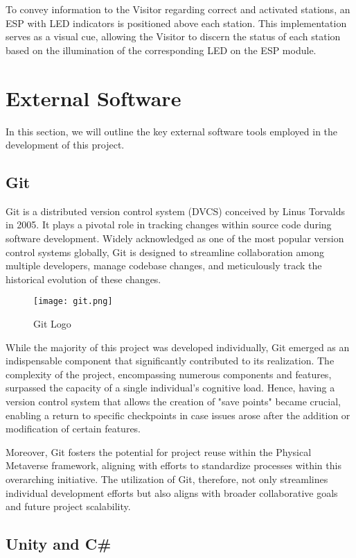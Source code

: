 \documentclass{Configuration_Files/PoliMi3i_thesis}
\begin{document}
To convey information to the Visitor regarding correct and activated stations, an ESP with LED indicators is positioned above each station. This implementation serves as a visual cue, allowing the Visitor to discern the status of each station based on the illumination of the corresponding LED on the ESP module.


\chapter{External Software}

In this section, we will outline the key external software tools employed in the development of this project.

\section{Git}

Git is a distributed version control system (DVCS) conceived by Linus Torvalds in 2005. It plays a pivotal role in tracking changes within source code during software development. Widely acknowledged as one of the most popular version control systems globally, Git is designed to streamline collaboration among multiple developers, manage codebase changes, and meticulously track the historical evolution of these changes.
\begin{figure}[h]
    \centering
    \texttt{[image: git.png]}
    \caption{Git Logo}
\end{figure}
While the majority of this project was developed individually, Git emerged as an indispensable component that significantly contributed to its realization. The complexity of the project, encompassing numerous components and features, surpassed the capacity of a single individual's cognitive load. Hence, having a version control system that allows the creation of "save points" became crucial, enabling a return to specific checkpoints in case issues arose after the addition or modification of certain features.

Moreover, Git fosters the potential for project reuse within the Physical Metaverse framework, aligning with efforts to standardize processes within this overarching initiative. The utilization of Git, therefore, not only streamlines individual development efforts but also aligns with broader collaborative goals and future project scalability.

 

\section{Unity and C\#}
\end{document}
